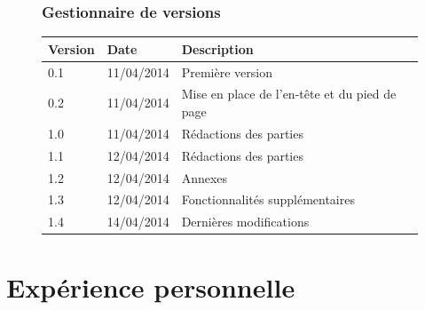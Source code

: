 \documentclass[12pt]{article}
\begin{document}
\setcounter{page}{2}
    	\begin{figure}[h]
        	\section*{Gestionnaire de versions}
		\centering
        	\begin{tabular}{|l|l|l|}
			\hline
            	\textbf{Version} & \textbf{Date} & \textbf{Description} \\
            	\hline
            	\hline
            		0.1 & 11/04/2014 & Première version \\
            	\hline
			0.2 & 11/04/2014 & Mise en place de l'en-tête et du pied de page \\
            	\hline
			1.0 & 11/04/2014 & Rédactions des parties \\
            	\hline
			1.1 & 12/04/2014 & Rédactions des parties \\
            	\hline
            		1.2 & 12/04/2014 & Annexes \\
            	\hline
            		1.3 & 12/04/2014 & Fonctionnalités supplémentaires\\
            	\hline
            		1.4 & 14/04/2014 & Dernières modifications\\
            	\hline
        	\end{tabular}
    	\end{figure}
\newpage

\renewcommand{\contentsname}{Sommaire}
\tableofcontents



\clearpage
\part*{Expérience personnelle}
\end{document}
